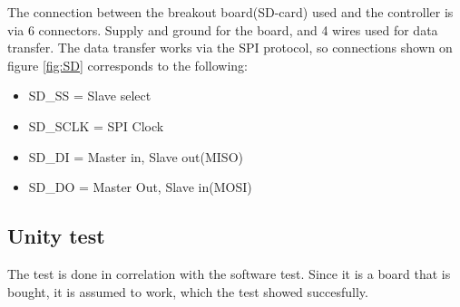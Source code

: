 The connection between the breakout board(SD-card) used and the controller is via 6 connectors. Supply and ground for the board, and 4 wires used for data transfer. The data transfer works via the SPI protocol, so connections shown on figure \vref{fig:SD} corresponds to the following:

\begin{itemize}
	\item{SD\_SS = Slave select}
	\item{SD\_SCLK = SPI Clock}
	\item{SD\_DI = Master in, Slave out(MISO)}
	\item{SD\_DO = Master Out, Slave in(MOSI)}
\end{itemize}

\subsection{Unity test}
The test is done in correlation with the software test. Since it is a board that is bought, it is assumed to work, which the test showed succesfully. 